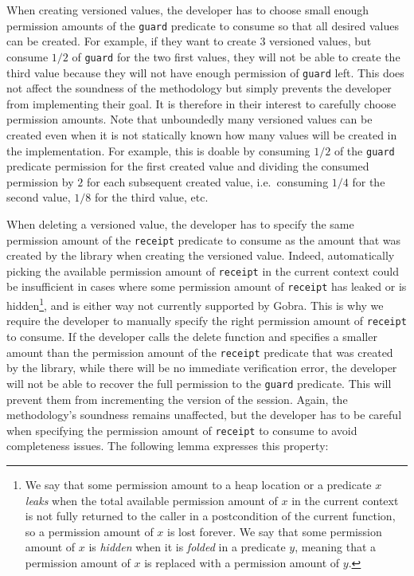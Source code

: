 When creating versioned values, the developer has to choose small enough permission amounts of the \texttt{guard} predicate to consume so that all desired values can be created.
For example, if they want to create $3$ versioned values, but consume $1/2$ of \texttt{guard} for the two first values, they will not be able to create the third value because they will not have enough permission of \texttt{guard} left.
This does not affect the soundness of the methodology but simply prevents the developer from implementing their goal.
It is therefore in their interest to carefully choose permission amounts.
Note that unboundedly many versioned values can be created even when it is not statically known how many values will be created in the implementation.
For example, this is doable by consuming $1/2$ of the \texttt{guard} predicate permission for the first created value and dividing the consumed permission by $2$ for each subsequent created value, i.e.\ consuming $1/4$ for the second value, $1/8$ for the third value, etc.

When deleting a versioned value, the developer has to specify the same permission amount of the \texttt{receipt} predicate to consume as the amount that was created by the library when creating the versioned value.
Indeed, automatically picking the available permission amount of \texttt{receipt} in the current context could be insufficient in cases where some permission amount of \texttt{receipt} has leaked or is hidden\footnote{We say that some permission amount to a heap location or a predicate $x$ \emph{leaks} when the total available permission amount of $x$ in the current context is not fully returned to the caller in a postcondition of the current function, so a permission amount of $x$ is lost forever. We say that some permission amount of $x$ is \emph{hidden} when it is \emph{folded} in a predicate $y$, meaning that a permission amount of $x$ is replaced with a permission amount of $y$.}, and is either way not currently supported by Gobra.
This is why we require the developer to manually specify the right permission amount of \texttt{receipt} to consume.
If the developer calls the delete function and specifies a smaller amount than the permission amount of the \texttt{receipt} predicate that was created by the library, while there will be no immediate verification error, the developer will not be able to recover the full permission to the \texttt{guard} predicate.
This will prevent them from incrementing the version of the session.
Again, the methodology's soundness remains unaffected, but the developer has to be careful when specifying the permission amount of \texttt{receipt} to consume to avoid completeness issues.
The following lemma expresses this property:

